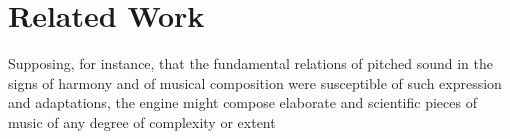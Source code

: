 \chapter{Related Work}
\begin{savequote}[75mm]
  Supposing, for instance, that the fundamental relations of pitched sound in the
  signs of harmony and of musical composition were susceptible of such expression and
  adaptations, the engine might compose elaborate and scientific pieces of music
  of any degree of complexity or extent
\end{savequote}




\ifpdf
    \graphicspath{{Chapter3/Figs/Raster/}{Chapter3/Figs/PDF/}{Chapter3/Figs/}}
\else
    \graphicspath{{Chapter3/Figs/Vector/}{Chapter3/Figs/}}
\fi




